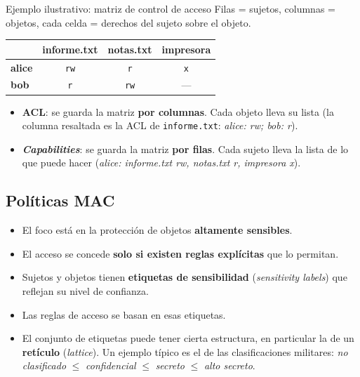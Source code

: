 \documentclass[11pt,a4paper]{report}
\begin{document}
\begin{ejemplo}{Ejemplo ilustrativo: matriz de control de acceso}
Filas = sujetos, columnas = objetos, cada celda = derechos del sujeto sobre el objeto.
\begin{center}
\small
{\renewcommand{\arraystretch}{1.25}%
\begin{tabular}{l c c c}
\toprule
 & \textbf{informe.txt} & \textbf{notas.txt} & \textbf{impresora} \\
\midrule
\textbf{alice} & \cellcolor{uc3m!10}\texttt{rw} & \texttt{r} & \texttt{x} \\
\textbf{bob}   & \cellcolor{uc3m!10}\texttt{r}  & \texttt{rw} & --- \\
\bottomrule
\end{tabular}}
\end{center}
\begin{itemize}
  \item \textbf{ACL}: se guarda la matriz \textbf{por columnas}. Cada objeto lleva su lista (la columna resaltada es la ACL de \texttt{informe.txt}: \emph{alice: rw; bob: r}).
  \item \textbf{\emph{Capabilities}}: se guarda la matriz \textbf{por filas}. Cada sujeto lleva la lista de lo que puede hacer (\emph{alice: informe.txt rw, notas.txt r, impresora x}).
\end{itemize}
\end{ejemplo}
 
\subsection{Políticas MAC}
 
\begin{itemize}
  \item El foco está en la protección de objetos \textbf{altamente sensibles}.
  \item El acceso se concede \textbf{solo si existen reglas explícitas} que lo permitan.
  \item Sujetos y objetos tienen \textbf{etiquetas de sensibilidad} (\emph{sensitivity labels}) que reflejan su nivel de confianza.
  \item Las reglas de acceso se basan en esas etiquetas.
  \item El conjunto de etiquetas puede tener cierta estructura, en particular la de un \textbf{retículo} (\emph{lattice}). Un ejemplo típico es el de las clasificaciones militares: \emph{no clasificado} $\le$ \emph{confidencial} $\le$ \emph{secreto} $\le$ \emph{alto secreto}.
\end{itemize}
 
\end{document}
